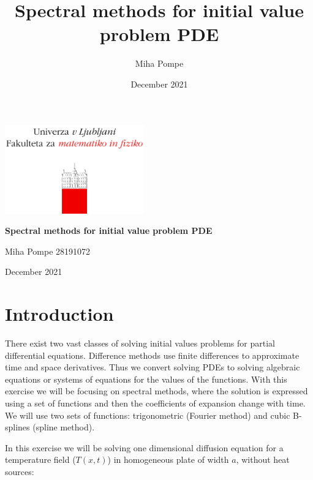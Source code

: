 \documentclass[12pt, a4paper]{article}
\title{Spectral methods for initial value problem PDE}
\author{Miha Pompe}
\date{December 2021}
\begin{document}
\begin{titlepage}
	\centering
 	\includegraphics[width=0.45\textwidth]{logo_fmf_uni-lj_sl_veliki.png}\par\vspace{1cm}

	\vspace{1cm}

	\vspace{1.5cm}
	{\huge\bfseries Spectral methods for initial value problem PDE\par}
	\vspace{2cm}
	{\Large Miha Pompe 28191072\par}
	\vfill

	\vfill

	{\large December 2021\par}
\end{titlepage}
\thispagestyle{empty}
\clearpage
{}
\newpage


\section{Introduction}
There exist two vast classes of solving initial values problems for partial differential equations. Difference methods use finite differences to approximate time and space derivatives. Thus we convert solving PDEs to solving algebraic equations or systems of equations for the values of the functions. With this exercise we will be focusing on spectral methods, where the solution is expressed using a set of functions and then the coefficients of expansion change with time. We will use two sets of functions: trigonometric (Fourier method) and cubic B-splines (spline method).

In this exercise we will be solving one dimensional diffusion equation for a temperature field ($T(x,t)$) in homogeneous plate of width $a$, without heat sources:
\end{document}
